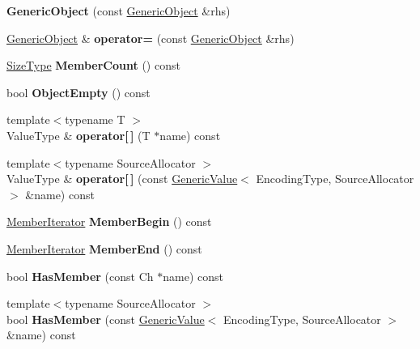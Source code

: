 \begin{DoxyCompactItemize}
\item 
\mbox{\label{a02080_a10173c42d0e8a71ca0e3ae75d800887a}} 
{\bfseries Generic\+Object} (const \hyperlink{a02080}{Generic\+Object} \&rhs)
\item 
\mbox{\label{a02080_af8984f76d6f3b13039c6d3b8e217f747}} 
\hyperlink{a02080}{Generic\+Object} \& {\bfseries operator=} (const \hyperlink{a02080}{Generic\+Object} \&rhs)
\item 
\mbox{\label{a02080_a15326564c82f2b545811f753534563e4}} 
\hyperlink{a00560_a5ed6e6e67250fadbd041127e6386dcb5}{Size\+Type} {\bfseries Member\+Count} () const
\item 
\mbox{\label{a02080_a9cc10bfeeb6a5eb95ba1ae587b6e6ad8}} 
bool {\bfseries Object\+Empty} () const
\item 
\mbox{\label{a02080_a2d8c758d10e7c7ab23e3904d5936b204}} 
{\footnotesize template$<$typename T $>$ }\\Value\+Type \& {\bfseries operator\mbox{[}$\,$\mbox{]}} (T $\ast$name) const
\item 
\mbox{\label{a02080_a19bfc1bd98b120d42e7d50db0886614a}} 
{\footnotesize template$<$typename Source\+Allocator $>$ }\\Value\+Type \& {\bfseries operator\mbox{[}$\,$\mbox{]}} (const \hyperlink{a01992}{Generic\+Value}$<$ Encoding\+Type, Source\+Allocator $>$ \&name) const
\item 
\mbox{\label{a02080_af1e80a8a521f05530f9b6a448242ff2d}} 
\hyperlink{a02004}{Member\+Iterator} {\bfseries Member\+Begin} () const
\item 
\mbox{\label{a02080_a75873786614f67796bfb190008e004dc}} 
\hyperlink{a02004}{Member\+Iterator} {\bfseries Member\+End} () const
\item 
\mbox{\label{a02080_a996d775e52cc7c5cf2aa308cf5a2b2cf}} 
bool {\bfseries Has\+Member} (const Ch $\ast$name) const
\item 
\mbox{\label{a02080_a0b63666ca05c86f9d719350f2302a3f7}} 
{\footnotesize template$<$typename Source\+Allocator $>$ }\\bool {\bfseries Has\+Member} (const \hyperlink{a01992}{Generic\+Value}$<$ Encoding\+Type, Source\+Allocator $>$ \&name) const

\end{DoxyCompactItemize}

